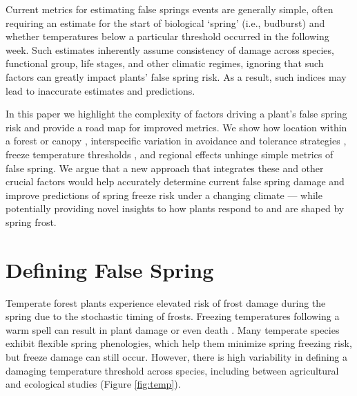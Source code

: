 \documentclass{article}\usepackage[]{graphicx}\usepackage[]{color}
\begin{document}
Current metrics for estimating false springs events are generally simple, often requiring an estimate for the start of biological `spring' (i.e., budburst) and whether temperatures below a particular threshold occurred in the following week. Such estimates inherently assume consistency of damage across species, functional group, life stages, and other climatic regimes, ignoring that such factors can greatly impact plants' false spring risk. As a result, such indices may lead to inaccurate estimates and predictions. %

In this paper we highlight the complexity of factors driving a plant's false spring risk and provide a road map for improved metrics. We show how location within a forest or canopy \citep{Augspurger2013}, interspecific variation in avoidance and tolerance strategies \citep{Martin2010, Muffler2016}, freeze temperature thresholds \citep{Lenz2013}, and regional effects \citep{Muffler2016} unhinge simple metrics of false spring. We argue that a new approach that integrates these and other crucial factors would help accurately determine current false spring damage and improve predictions of spring freeze risk under a changing climate --- while potentially providing novel insights to how plants respond to and are shaped by spring frost. %

\section*{Defining False Spring}
Temperate forest plants experience elevated risk of frost damage during the spring due to the stochastic timing of frosts. Freezing temperatures following a warm spell can result in plant damage or even death \citep{Ludlum1968, Mock2007}. Many temperate species exhibit flexible spring phenologies, which help them minimize spring freezing risk, but freeze damage can still occur. %
However, there is high variability in defining a damaging temperature threshold across species, including between agricultural and ecological studies (Figure \ref{fig:temp}).
\end{document}
